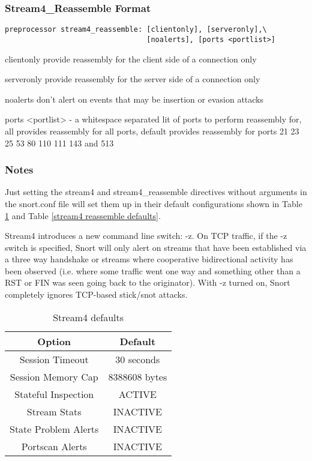\documentclass[english]{report}
\begin{document}
\subsubsection{Stream4\_Reassemble Format}

\begin{verbatim}
preprocessor stream4_reassemble: [clientonly], [serveronly],\
                                 [noalerts], [ports <portlist>]
\end{verbatim}
\begin{list}{}
\item [clientonly]provide reassembly for the client side of a connection
only
\item [serveronly]provide reassembly for the server side of a connection
only
\item [noalerts]don't alert on events that may be insertion or evasion
attacks
\item [ports]<portlist> - a whitespace separated lit of ports to perform
reassembly for, all provides reassembly for all
ports, default provides reassembly for ports 21
23 25 53 80 110 111 143 and 513
\end{list}

\subsubsection{Notes}

Just setting the stream4 and stream4\_reassemble directives without
arguments in the snort.conf file will set them up in their default
configurations shown in Table \ref{stream4 defaults} and Table \ref{stream4 reassemble defaults}.

Stream4 introduces a new command line switch: -z.
On TCP traffic, if the -z switch is specified, Snort will only alert
on streams that have been established via a three way handshake or
streams where cooperative bidirectional activity has been observed
(i.e. where some traffic went one way and something other than a RST
or FIN was seen going back to the originator). With -z
turned on, Snort completely ignores TCP-based stick/snot attacks.

%
\begin{table}[!hbpt]

\caption{Stream4 defaults\label{stream4 defaults}}

\begin{center}\begin{tabular}{|c|c|}
\hline 
Option&
Default\\
\hline
\hline 
Session Timeout&
30 seconds\\
\hline 
Session Memory Cap&
8388608 bytes\\
\hline 
Stateful Inspection&
ACTIVE\\
\hline 
Stream Stats&
INACTIVE\\
\hline 
State Problem Alerts&
INACTIVE\\
\hline 
Portscan Alerts&
INACTIVE\\
\hline
\end{tabular}\end{center}
\end{table}
\end{document}
